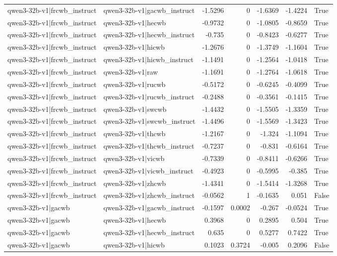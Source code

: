 \begin{table}
\begin{tabular}{l l r r r r l}
qwen3-32b-v1|frcwb_instruct & qwen3-32b-v1|gacwb_instruct & -1.5296 & 0 & -1.6369 & -1.4224 & True \\
qwen3-32b-v1|frcwb_instruct & qwen3-32b-v1|hecwb & -0.9732 & 0 & -1.0805 & -0.8659 & True \\
qwen3-32b-v1|frcwb_instruct & qwen3-32b-v1|hecwb_instruct & -0.735 & 0 & -0.8423 & -0.6277 & True \\
qwen3-32b-v1|frcwb_instruct & qwen3-32b-v1|hicwb & -1.2676 & 0 & -1.3749 & -1.1604 & True \\
qwen3-32b-v1|frcwb_instruct & qwen3-32b-v1|hicwb_instruct & -1.1491 & 0 & -1.2564 & -1.0418 & True \\
qwen3-32b-v1|frcwb_instruct & qwen3-32b-v1|raw & -1.1691 & 0 & -1.2764 & -1.0618 & True \\
qwen3-32b-v1|frcwb_instruct & qwen3-32b-v1|rucwb & -0.5172 & 0 & -0.6245 & -0.4099 & True \\
qwen3-32b-v1|frcwb_instruct & qwen3-32b-v1|rucwb_instruct & -0.2488 & 0 & -0.3561 & -0.1415 & True \\
qwen3-32b-v1|frcwb_instruct & qwen3-32b-v1|swcwb & -1.4432 & 0 & -1.5505 & -1.3359 & True \\
qwen3-32b-v1|frcwb_instruct & qwen3-32b-v1|swcwb_instruct & -1.4496 & 0 & -1.5569 & -1.3423 & True \\
qwen3-32b-v1|frcwb_instruct & qwen3-32b-v1|thcwb & -1.2167 & 0 & -1.324 & -1.1094 & True \\
qwen3-32b-v1|frcwb_instruct & qwen3-32b-v1|thcwb_instruct & -0.7237 & 0 & -0.831 & -0.6164 & True \\
qwen3-32b-v1|frcwb_instruct & qwen3-32b-v1|vicwb & -0.7339 & 0 & -0.8411 & -0.6266 & True \\
qwen3-32b-v1|frcwb_instruct & qwen3-32b-v1|vicwb_instruct & -0.4923 & 0 & -0.5995 & -0.385 & True \\
qwen3-32b-v1|frcwb_instruct & qwen3-32b-v1|zhcwb & -1.4341 & 0 & -1.5414 & -1.3268 & True \\
qwen3-32b-v1|frcwb_instruct & qwen3-32b-v1|zhcwb_instruct & -0.0562 & 1 & -0.1635 & 0.051 & False \\
qwen3-32b-v1|gacwb & qwen3-32b-v1|gacwb_instruct & -0.1597 & 0.0002 & -0.267 & -0.0524 & True \\
qwen3-32b-v1|gacwb & qwen3-32b-v1|hecwb & 0.3968 & 0 & 0.2895 & 0.504 & True \\
qwen3-32b-v1|gacwb & qwen3-32b-v1|hecwb_instruct & 0.635 & 0 & 0.5277 & 0.7422 & True \\
qwen3-32b-v1|gacwb & qwen3-32b-v1|hicwb & 0.1023 & 0.3724 & -0.005 & 0.2096 & False \\

\end{tabular}
\end{table}
